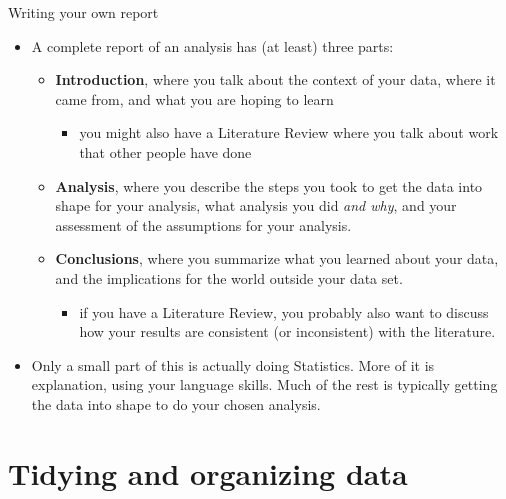 \documentclass[ignorenonframetext,]{beamer}
\providecommand{\tightlist}{%
  \setlength{\itemsep}{0pt}\setlength{\parskip}{0pt}}
\begin{document}
\begin{frame}{Writing your own report}
\protect\hypertarget{writing-your-own-report}{}

\begin{itemize}
\tightlist
\item
  A complete report of an analysis has (at least) three parts:

  \begin{itemize}
  \tightlist
  \item
    \textbf{Introduction}, where you talk about the context of your
    data, where it came from, and what you are hoping to learn

    \begin{itemize}
    \tightlist
    \item
      you might also have a Literature Review where you talk about work
      that other people have done
    \end{itemize}
  \item
    \textbf{Analysis}, where you describe the steps you took to get the
    data into shape for your analysis, what analysis you did \emph{and
    why}, and your assessment of the assumptions for your analysis.
  \item
    \textbf{Conclusions}, where you summarize what you learned about
    your data, and the implications for the world outside your data set.

    \begin{itemize}
    \tightlist
    \item
      if you have a Literature Review, you probably also want to discuss
      how your results are consistent (or inconsistent) with the
      literature.
    \end{itemize}
  \end{itemize}
\item
  Only a small part of this is actually doing Statistics. More of it is
  explanation, using your language skills. Much of the rest is typically
  getting the data into shape to do your chosen analysis.
\end{itemize}

\end{frame}

\hypertarget{tidying-and-organizing-data}{%
\section{Tidying and organizing
data}\label{tidying-and-organizing-data}}
\end{document}
